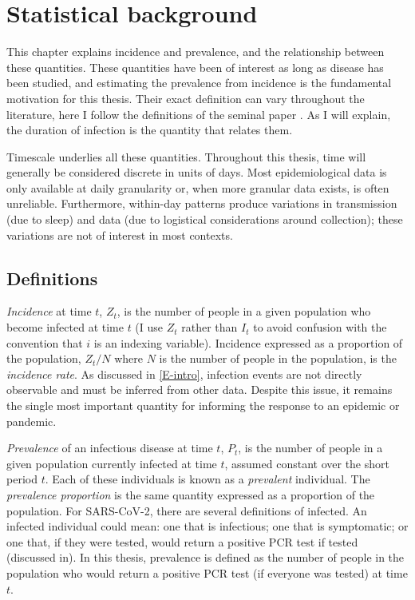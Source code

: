 \documentclass[thesis.tex]{subfiles}
\begin{document}
\chapter{Statistical background} \label{incidence-prevalence}

This chapter explains incidence and prevalence, and the relationship between these quantities.
These quantities have been of interest as long as disease has been studied, and estimating the prevalence from incidence is the fundamental motivation for this thesis.
Their exact definition can vary throughout the literature, here I follow the definitions of the seminal paper \textcite{freemanPrevalence}.
As I will explain, the duration of infection is the quantity that relates them.

Timescale underlies all these quantities.
Throughout this thesis, time will generally be considered discrete in units of days.
Most epidemiological data is only available at daily granularity or, when more granular data exists, is often unreliable.
Furthermore, within-day patterns produce variations in transmission (\eg due to sleep) and data (\eg due to logistical considerations around collection); these variations are not of interest in most contexts.

\section{Definitions}

\emph{Incidence} at time $t$, $Z_t$, is the number of people in a given population who become infected at time $t$ (I use $Z_t$ rather than $I_t$ to avoid confusion with the convention that $i$ is an indexing variable).
Incidence expressed as a proportion of the population, $Z_t/N$ where $N$ is the number of people in the population, is the \emph{incidence rate}.
As discussed in \cref{E-intro}, infection events are not directly observable and must be inferred from other data.
Despite this issue, it remains the single most important quantity for informing the response to an epidemic or pandemic.

\emph{Prevalence} of an infectious disease at time $t$, $P_t$, is the number of people in a given population currently infected at time $t$, assumed constant over the short period $t$.
Each of these individuals is known as a \emph{prevalent} individual.
The \emph{prevalence proportion} is the same quantity expressed as a proportion of the population.
For SARS-CoV-2, there are several definitions of infected.
An infected individual could mean: one that is infectious; one that is symptomatic; or one that, if they were tested, would return a positive PCR test if tested (discussed in).
In this thesis, prevalence is defined as the number of people in the population who would return a positive PCR test (if everyone was tested) at time $t$.
\end{document}
